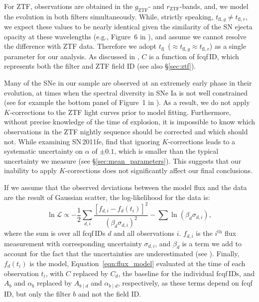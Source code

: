 \documentclass[twocolumn]{aastex63}
\newcommand{\rztf}{$r_\mathrm{ZTF}$}
\newcommand{\gztf}{$g_\mathrm{ZTF}$}
\newcommand{\tfl}{$t_\mathrm{fl}$}
\begin{document}
For ZTF, observations are obtained in the \gztf- and \rztf-bands, and, we
model the evolution in both filters simultaneously. While, strictly speaking,
$t_{\mathrm{fl}, g} \ne t_{\mathrm{fl}, r}$, we expect these values to be
nearly identical given the similarity of the SN ejecta opacity at these
wavelengths (e.g., Figure~6 in \citealt{Magee18}), and assume we cannot
resolve the difference with ZTF data. Therefore we adopt \tfl\ ($\approx
t_{\mathrm{fl}, g} \approx t_{\mathrm{fl}, r}$) as a single parameter for our
analysis. As discussed in \citet{Yao19}, $C$ is a function of fcqf\,ID, which
represents both the filter and ZTF field ID (see also \S\ref{sec:ztf}).

Many of the SNe in our sample are observed at an extremely early phase in
their evolution, at times when the spectral diversity in SNe Ia is not well
constrained (see for example the bottom panel of Figure~1 in \citealt{Guy07}).
As a result, we do not apply $K$-corrections to the ZTF light curves prior to
model fitting. Furthermore, without precise knowledge of the time of
explosion, it is impossible to know which observations in the ZTF nightly
sequence should be corrected and which should not. While examining SN\,2011fe,
\citet{Firth15} find that ignoring $K$-corrections leads to a systematic
uncertainty on $\alpha$ of $\pm0.1$, which is smaller than the typical
uncertainty we measure (see \S\ref{sec:mean_parameters}). This suggests that
our inability to apply $K$-corrections does not significantly affect our final
conclusions.

If we assume that the observed deviations between the model flux and the data
are the result of Gaussian scatter, the log-likelihood for the data is:
%
\begin{equation}
    \ln \mathscr{L} \propto -\frac{1}{2}\sum_{d,i} \frac{[f_{d,i} - f_d(t_i)]^2}{(\beta_d \sigma_{d,i})^2} -\sum{\ln (\beta_d \sigma_{d,i})},
\end{equation}
%
where the sum is over all fcqf\,IDs $d$ and all observations $i$. $f_{d,i}$
is the $i^\mathrm{th}$ flux measurement with corresponding uncertainty
$\sigma_{d,i}$, and $\beta_d$ is a term we add to account for the fact that
the uncertainties are underestimated (see \citealt{Yao19}). Finally,
$f_d(t_i)$ is the model, Equation~\ref{eqn:flux_model} evaluated at the time
of each observation $t_i$, with $C$ replaced by $C_d$, the baseline for the
individual fcqf\,IDs, and $A_b$ and $\alpha_b$ replaced by $A_{b\mid d}$ and
$\alpha_{b\mid d}$, respectively, as these terms depend on fcqf\,ID, but
only the filter $b$ and not the field ID.
\end{document}

